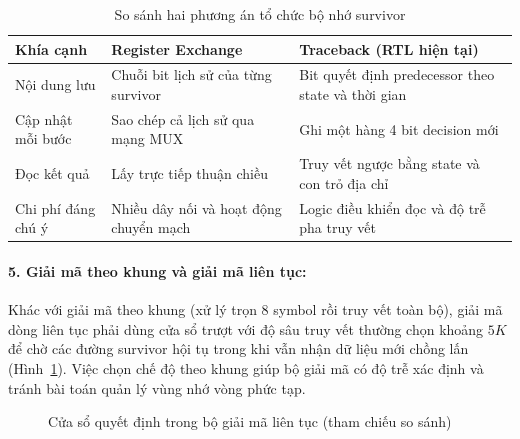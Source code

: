 \documentclass[12pt,a4paper]{article}
\renewcommand{\_}{\originalunderscore\allowbreak}
\begin{document}
\begin{table}[H]\centering\small
\begin{tabularx}{\textwidth}{@{}P{3.1cm}Y Y@{}}\toprule
\textbf{Khía cạnh}&\textbf{Register Exchange}&\textbf{Traceback (RTL hiện tại)}\\\midrule
Nội dung lưu&Chuỗi bit lịch sử của từng survivor&Bit quyết định predecessor theo state và thời gian\\
Cập nhật mỗi bước&Sao chép cả lịch sử qua mạng MUX&Ghi một hàng 4 bit decision mới\\
Đọc kết quả&Lấy trực tiếp thuận chiều&Truy vết ngược bằng state và con trỏ địa chỉ\\
Chi phí đáng chú ý&Nhiều dây nối và hoạt động chuyển mạch&Logic điều khiển đọc và độ trễ pha truy vết\\\bottomrule
\end{tabularx}
\caption{So sánh hai phương án tổ chức bộ nhớ survivor}\label{tab:theory-sm}
\end{table}

\paragraph{5. Giải mã theo khung và giải mã liên tục:} Khác với giải mã theo khung (xử lý trọn 8 symbol rồi truy vết toàn bộ), giải mã dòng liên tục phải dùng cửa sổ trượt với độ sâu truy vết thường chọn khoảng $5K$ \cite[Mục 9.4]{mit-lecture} để chờ các đường survivor hội tụ trong khi vẫn nhận dữ liệu mới chồng lấn (Hình~\ref{fig:theory-window}). Việc chọn chế độ theo khung giúp bộ giải mã có độ trễ xác định và tránh bài toán quản lý vùng nhớ vòng phức tạp.

\begin{figure}[H]\centering
{}
\caption{Cửa sổ quyết định trong bộ giải mã liên tục (tham chiếu so sánh)}\label{fig:theory-window}
\end{figure}
\end{document}
